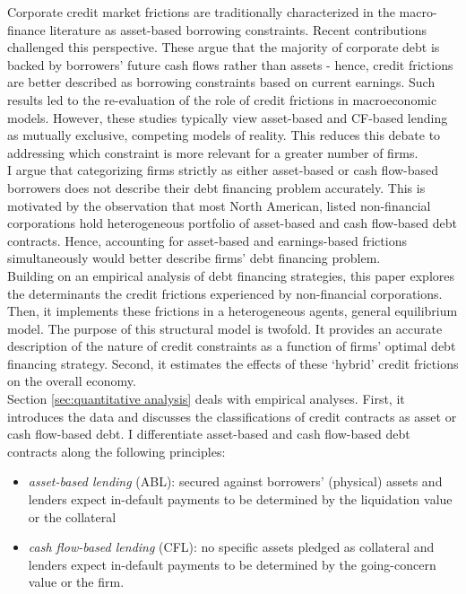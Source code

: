 \documentclass[12pt]{article}
\begin{document}
Corporate credit market frictions are traditionally characterized in the macro-finance literature as asset-based borrowing constraints. Recent contributions challenged this perspective. These argue that the majority of corporate debt is backed by borrowers’ future cash flows rather than assets - hence, credit frictions are better described as borrowing constraints based on current earnings. Such results led to the re-evaluation of the role of credit frictions in macroeconomic models. However, these studies typically view asset-based and CF-based lending as mutually exclusive, competing models of reality. This reduces this debate to addressing which constraint is more relevant for a greater number of firms. \vspace{3mm} \\
I argue that categorizing firms strictly as either asset-based or cash flow-based borrowers does not describe their debt financing problem accurately. This is motivated by the observation that most North American, listed non-financial corporations hold heterogeneous portfolio of asset-based and cash flow-based debt contracts. Hence, accounting for asset-based and earnings-based frictions simultaneously would better describe firms' debt financing problem. \vspace{3mm} \\
Building on an empirical analysis of debt financing strategies, this paper explores the determinants the credit frictions experienced by non-financial corporations. Then, it implements these frictions in a heterogeneous agents, general equilibrium model. The purpose of this structural model is twofold. It provides an accurate description of the nature of credit constraints as a function of firms' optimal debt financing strategy. Second, it estimates the effects of these `hybrid' credit frictions on the overall economy. 
\vspace{3mm} \\
Section \ref{sec:quantitative analysis} deals with empirical analyses. First, it introduces the data and discusses the classifications of credit contracts as asset or cash flow-based debt. I differentiate asset-based and cash flow-based debt contracts along the following principles:  
\begin{itemize}
\item \textit{asset-based lending} (ABL): secured against borrowers' (physical) assets and lenders expect in-default payments to be determined by the liquidation value or the collateral
\item \textit{cash flow-based lending} (CFL): no specific assets pledged as collateral and lenders expect in-default payments to be determined by the going-concern value or the firm.
\end{itemize}
\end{document}
